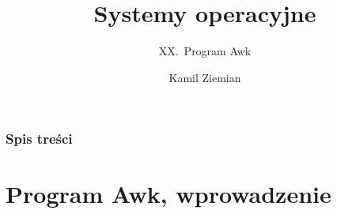 \documentclass[10pt,t]{beamer}
\title{Systemy operacyjne}
\subtitle{XX.~Program Awk}
\author{Kamil Ziemian \\
  \email}
\begin{document}





\RaggedRight





\maketitle










\begin{frame}
  \frametitle{Spis treści}


  \tableofcontents

\end{frame}










\section{Program Awk, wprowadzenie}
\end{document}
